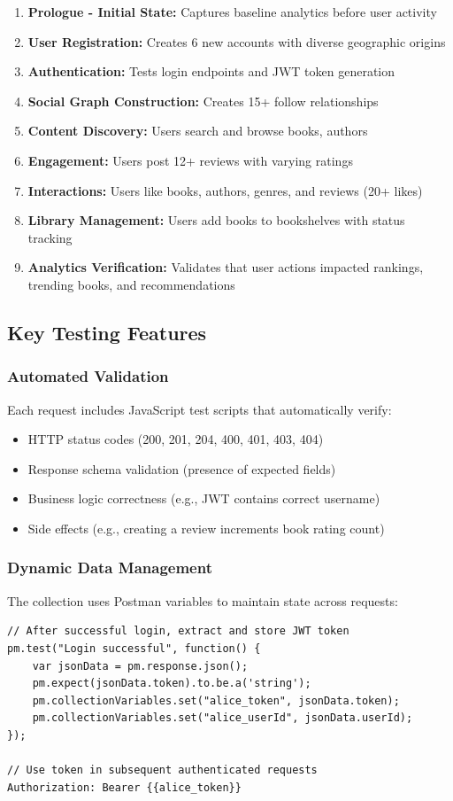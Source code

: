 \begin{enumerate}
    \item \textbf{Prologue - Initial State:} Captures baseline analytics before user activity
    \item \textbf{User Registration:} Creates 6 new accounts with diverse geographic origins
    \item \textbf{Authentication:} Tests login endpoints and JWT token generation
    \item \textbf{Social Graph Construction:} Creates 15+ follow relationships
    \item \textbf{Content Discovery:} Users search and browse books, authors
    \item \textbf{Engagement:} Users post 12+ reviews with varying ratings
    \item \textbf{Interactions:} Users like books, authors, genres, and reviews (20+ likes)
    \item \textbf{Library Management:} Users add books to bookshelves with status tracking
    \item \textbf{Analytics Verification:} Validates that user actions impacted rankings, trending books, and recommendations
\end{enumerate}

\subsection{Key Testing Features}

\subsubsection{Automated Validation}
Each request includes JavaScript test scripts that automatically verify:
\begin{itemize}
    \item HTTP status codes (200, 201, 204, 400, 401, 403, 404)
    \item Response schema validation (presence of expected fields)
    \item Business logic correctness (e.g., JWT contains correct username)
    \item Side effects (e.g., creating a review increments book rating count)
\end{itemize}

\subsubsection{Dynamic Data Management}
The collection uses Postman variables to maintain state across requests:
\begin{lstlisting}[caption={Postman Test Script Example}]
// After successful login, extract and store JWT token
pm.test("Login successful", function() {
    var jsonData = pm.response.json();
    pm.expect(jsonData.token).to.be.a('string');
    pm.collectionVariables.set("alice_token", jsonData.token);
    pm.collectionVariables.set("alice_userId", jsonData.userId);
});

// Use token in subsequent authenticated requests
Authorization: Bearer {{alice_token}}
\end{lstlisting}

